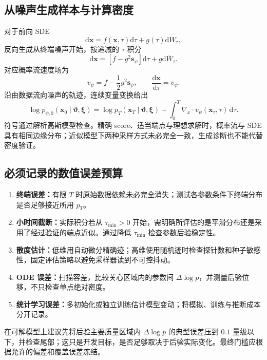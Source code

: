 \documentclass[UTF8,fontset=fandol,a4paper,11pt]{ctexart}
\numberwithin{equation}{section}
\newcommand{\dd}{\mathrm d}
\newcommand{\btheta}{\boldsymbol\vartheta}
\newcommand{\bxi}{\boldsymbol\xi}
\newcommand{\bs}{\boldsymbol s}
\newcommand{\bx}{\boldsymbol x}
\begin{document}
\subsection{从噪声生成样本与计算密度}
对于前向 SDE
\begin{equation}
\dd\bx=f(\bx,\tau)\dd\tau+g(\tau)\dd W_\tau,
\end{equation}
反向生成从终端噪声开始，按递减的 $\tau$ 积分
\begin{equation}
\dd\bx=\left[f-g^2\bs_\psi\right]\dd\tau+g\dd\overline W_\tau.
\end{equation}
对应概率流速度场为
\begin{equation}
v_\psi=f-\frac12g^2\bs_\psi,\qquad
\frac{\dd\bx}{\dd\tau}=v_\psi.
\end{equation}
沿由数据流向噪声的轨迹，连续变量变换给出
\begin{equation}
\log p_{\psi,0}(\bx_0\mid\btheta,\bxi)
=\log p_T(\bx_T\mid\btheta,\bxi)
+\int_0^T\nabla_x\cdot v_\psi(\bx_\tau,\tau)\,\dd\tau.
\label{eq:pf}
\end{equation}
符号通过解析高斯模型检查。精确 score、适当端点与理想求解时，概率流与 SDE 具有相同边缘分布\cite{scoresde}；近似模型下两种采样方式未必完全一致，生成诊断也不能代替密度验证。

\subsection{必须记录的数值误差预算}
\begin{enumerate}
\item \textbf{终端误差：}有限 $T$ 时原始数据依赖未必完全消失；测试各参数条件下终端分布是否足够接近所用 $p_T$。
\item \textbf{小时间截断：}实际积分若从 $\tau_{\min}>0$ 开始，需明确所评估的是平滑分布还是采用了经过验证的端点近似。通过降低 $\tau_{\min}$ 检查参数后验稳定性。
\item \textbf{散度估计：}低维用自动微分精确迹；高维使用随机迹时检查探针数和种子敏感性，固定评估策略以避免采样器读到不可控抖动。
\item \textbf{ODE 误差：}扫描容差，比较关心区域内的参数间 $\Delta\log p$，并测量后验位移，不只检查单点绝对密度。
\item \textbf{统计学习误差：}多初始化或独立训练估计模型变动；将模拟、训练与推断成本分开记录。
\end{enumerate}
在可解模型上建议先将后验主要质量区域内 $\Delta\log p$ 的典型误差压到 $0.1$ 量级以下，并检查尾部；这只是开发目标，是否足够取决于后验实际变化。最终门槛应根据允许的偏差和覆盖误差冻结。
\end{document}
